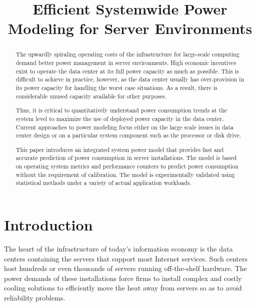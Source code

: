 \documentclass[times, 10pt,onecolumn]{article}
\begin{document}
\title{Efficient Systemwide Power Modeling for Server Environments}
\author[*]{}
\maketitle
\newtheorem{defn}{Definition}
\newtheorem{thm}{Theorem}
\thispagestyle{empty}
\doublespacing

\begin{abstract}
  The upwardly spiraling operating costs of the infrastructure for
  large-scale computing demand better power management in server
  environments.  High economic incentives exist to operate the data
  center at its full power capacity as much as possible.  This is
  difficult to achieve in practice, however, as the data center usually
  has over-provision in its power capacity for handling the worst case
  situations. As a result, there is considerable unused capacity
  available for other purposes.

  Thus, it is critical to quantitatively understand power consumption
  trends at the system level to maximize the use of deployed power
  capacity in the data center. Current approaches to power modeling
  focus either on the large scale issues in data center design or on a
  particular system component such as the processor or disk drive.

  This paper introduces an integrated system power model that provides
  fast and accurate prediction of power consumption in server
  installations.  The model is based on operating system metrics and
  performance counters to predict power consumption without the
  requirement of calibration.  The model is experimentally validated
  using statistical methods under a variety of actual application
  workloads.
\end{abstract}

\section{Introduction}
\label{sec:Introduction}
The heart of the infrastructure of today's information economy is the
data centers containing the servers that support most Internet services.
Such centers host hundreds or even thousands of servers running
off-the-shelf hardware.  The power demands of these installations force
firms to install complex and costly cooling solutions to efficiently
move the heat away from servers so as to avoid reliability problems.
\end{document}
